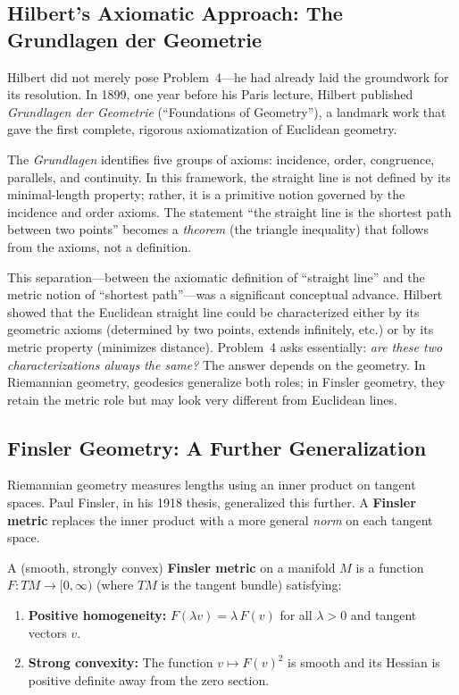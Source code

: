 \subsection{Hilbert's Axiomatic Approach: The Grundlagen der Geometrie}

Hilbert did not merely pose Problem~4---he had already laid the groundwork for its resolution. In 1899, one year before his Paris lecture, Hilbert published \emph{Grundlagen der Geometrie} (``Foundations of Geometry''), a landmark work that gave the first complete, rigorous axiomatization of Euclidean geometry.

The \emph{Grundlagen} identifies five groups of axioms: incidence, order, congruence, parallels, and continuity. In this framework, the straight line is not defined by its minimal-length property; rather, it is a primitive notion governed by the incidence and order axioms. The statement ``the straight line is the shortest path between two points'' becomes a \emph{theorem} (the triangle inequality) that follows from the axioms, not a definition.

This separation---between the axiomatic definition of ``straight line'' and the metric notion of ``shortest path''---was a significant conceptual advance. Hilbert showed that the Euclidean straight line could be characterized either by its geometric axioms (determined by two points, extends infinitely, etc.) or by its metric property (minimizes distance). Problem~4 asks essentially: \emph{are these two characterizations always the same?} The answer depends on the geometry. In Riemannian geometry, geodesics generalize both roles; in Finsler geometry, they retain the metric role but may look very different from Euclidean lines.

\subsection{Finsler Geometry: A Further Generalization}

Riemannian geometry measures lengths using an inner product on tangent spaces. Paul Finsler, in his 1918 thesis, generalized this further. A \textbf{Finsler metric} replaces the inner product with a more general \emph{norm} on each tangent space.

\begin{definition}
A (smooth, strongly convex) \textbf{Finsler metric} on a manifold $M$ is a function $F : TM \to [0,\infty)$ (where $TM$ is the tangent bundle) satisfying:
\begin{enumerate}
    \item \textbf{Positive homogeneity:} $F(\lambda v) = \lambda \, F(v)$ for all $\lambda > 0$ and tangent vectors $v$.
    \item \textbf{Strong convexity:} The function $v \mapsto F(v)^2$ is smooth and its Hessian is positive definite away from the zero section.
\end{enumerate}
\end{definition}


